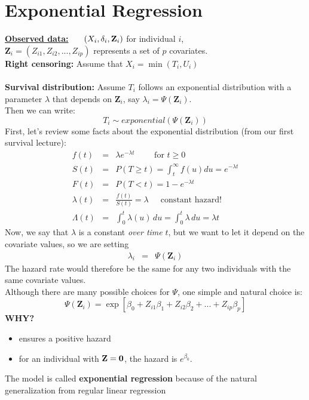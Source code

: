 \documentclass[11pt,psfig]{book}
\newcommand{\bfZ}{\mathbf{Z}}
\begin{document}
\section{Exponential Regression}
\underline{\bf Observed data:} ~~~$(X_i, \delta_i, {\bf Z}_i)$
for individual $i$,\\[2ex]
$\bfZ_i= (Z_{i1}, Z_{i2},...,Z_{ip})$ represents a set of $p$
covariates.
\\[2ex]
{\bf Right censoring:}  Assume that  $X_i = \min(T_i,U_i)$\\
\\[2ex]
{\bf Survival distribution:} Assume $T_i$ follows an exponential
distribution with a parameter $\lambda$ that depends on $\bfZ_i$,
say $\lambda_i=\Psi(\bfZ_i)$.
\\[2ex]
Then we can write:
\[  T_i \sim exponential(\Psi(\bfZ_i)) \]
First, let's review some facts about the exponential distribution
(from our first survival lecture):
\begin{eqnarray*}
f(t) & = & \lambda e^{-\lambda t} ~~~~~~~~~\mbox{ for } t\ge 0 \\[2ex]
S(t) & = & P(T \geq t) = \int_t^\infty f(u) du = e^{-\lambda t} \\[2ex]
F(t) & = & P(T < t) = 1 - e^{-\lambda t} \\[2ex]
\lambda(t) & = & \frac{f(t)}{S(t)} =  \lambda
~~~~~\mbox{ constant hazard!} \\[2ex]
\Lambda(t) & = & \int_0^t \lambda(u) \, du  =  \int_0^t \lambda \, du
= \lambda t
\end{eqnarray*}
Now, we say that $\lambda$ is a constant {\em over time} $t$, but we
want to let it depend on the covariate values, so we are setting
\begin{eqnarray*}
\lambda_i & = & \Psi(\bfZ_i)
\end{eqnarray*}
The hazard rate would therefore be the same for any two individuals
with the same covariate values.
\\[2ex]
Although there are many possible choices for $\Psi$, one simple and
natural choice is:
\[\Psi(\bfZ_i) =
\exp[ \beta_0 + Z_{i1} \beta_1 + Z_{i2} \beta_2 + ... + Z_{ip} \beta_p] \]
{\bf WHY?}
\begin{itemize}
\item ensures a positive hazard
\item for an individual with ${\bfZ}={\bf 0}$, the hazard is
$e^{\beta_0}$.
\end{itemize}
The model is called {\bf exponential regression} because of
the natural generalization from regular linear regression
\end{document}
